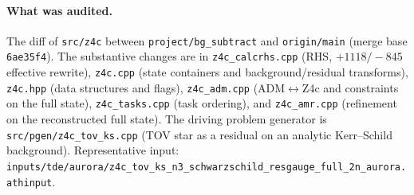 \documentclass[11pt]{article}
\newcommand{\code}[1]{\texttt{#1}}
\newcommand{\file}[1]{\texttt{#1}}
\begin{document}
\paragraph{What was audited.} The diff of \file{src/z4c} between
\file{project/bg\_subtract} and \file{origin/main} (merge base
\code{6ae35f4}). The substantive changes are in
\file{z4c\_calcrhs.cpp} (RHS, $+1118/-845$ effective rewrite),
\file{z4c.cpp} (state containers and background/residual transforms),
\file{z4c.hpp} (data structures and flags),
\file{z4c\_adm.cpp} (ADM$\leftrightarrow$Z4c and constraints on the full
state), \file{z4c\_tasks.cpp} (task ordering), and \file{z4c\_amr.cpp}
(refinement on the reconstructed full state). The driving problem generator is
\file{src/pgen/z4c\_tov\_ks.cpp} (TOV star as a residual on an analytic
Kerr--Schild background). Representative input:
\file{inputs/tde/aurora/z4c\_tov\_ks\_n3\_schwarzschild\_resgauge\_full\_2n\_aurora.athinput}.
\end{document}
